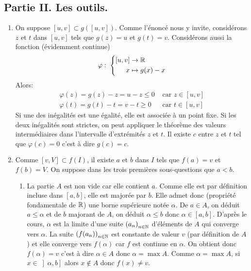 \subsection*{Partie II. Les outils.}
\begin{enumerate}
  \item On suppose $[u,v]\subset g([u,v])$. Comme l'énoncé nous y invite, considérons $z$ et $t$ dans $[u,v]$ tels que $g(z)=u$ et $g(t)=v$. Considérons aussi la fonction (évidemment continue)
\begin{displaymath}
  \varphi: \;
  \left\lbrace 
  \begin{aligned}
    \left[ u,v\right] &\rightarrow \mathbb{R} \\
    x &\mapsto g(x) - x
  \end{aligned}
\right. 
\end{displaymath}
Alors:
\begin{align*}
\varphi(z) = g(z) -z = u-z \leq 0 &\text{ car } z\in \left[ u,v\right] \\
\varphi(t) = g(t) -t = v-t \geq 0 &\text{ car } t\in \left[ u,v\right]
\end{align*}
Si une des inégalités est une égalité, elle est associée à un point fixe. Si les deux inégalités sont strictes, on peut appliquer le théorème des valeurs intermédiaires dans l'intervalle d'extrémités $z$ et $t$. Il existe $c$ entre $z$ et $t$ tel que $\varphi(c)=0$ c'est à dire $g(c) = c$.
  \item Comme $[v,V] \subset f(I)$, il existe $a$ et $b$ dans $I$ tels que $f(a)=v$ et $f(b)=V$. On suppose dans les trois premières sous-questions que $a<b$.
\begin{enumerate}
  \item La partie $A$ est non vide car elle contient $a$. Comme elle est par définition incluse dans $[a,b]$, elle est majorée par $b$. Elle admet donc (propriété fondamentale de $\mathbb{R}$) une borne supérieure notée $\alpha$. De $a\in A$, on déduit $a\leq \alpha$ et de $b$ majorant de $A$, on déduit $\alpha \leq b$ donc $\alpha \in [a,b]$.\newline
  D'après le cours, $\alpha$ est la limite d'une suite $\left( a_n\right)_{n\in \mathbb{N}}$ d'éléments de $A$ qui converge vers $\alpha$. La suite $\left( f(a_n)\right)_{n\in \mathbb{N}}$ est constante de valeur $v$ (par définition de $A$) et elle converge vers $f(\alpha)$ car $f$ est continue en $\alpha$. On obtient donc $f(\alpha)=v$ c'est à dire $\alpha\in A$ donc $\alpha = \max A$.\newline
  Comme $\alpha = \max A$, si $x \in \left]\alpha ,b\right]$ alors $x\notin A$ donc $f(x) \neq v$.\newline

\end{enumerate}
\end{enumerate}
